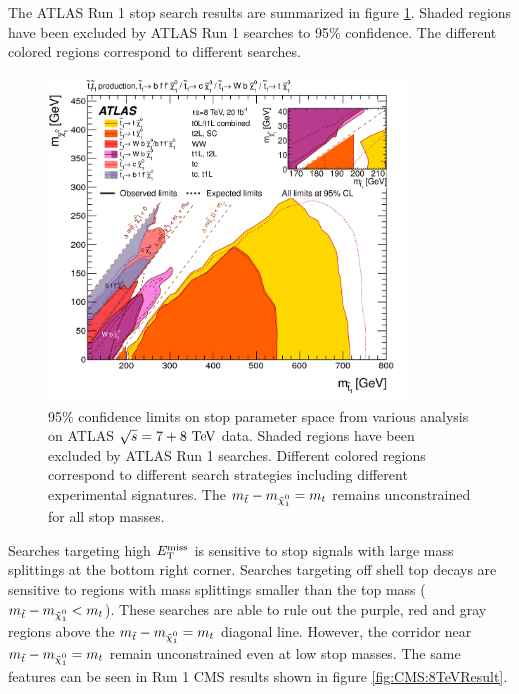 \indent The ATLAS Run 1 stop search results are summarized in figure \ref{fig:ATLAS:8TeVResult}.  Shaded regions have been excluded by ATLAS Run 1 searches to 95\% confidence.  The different colored regions correspond to different searches.  \\

\begin{figure}[h!]
\centering
    \includegraphics[width=0.85\textwidth]{figures/8TeV/ATLAS_SUSY_Stop_tLSP_201507.png}\hspace{0.05\textwidth}
\caption[95\% confidence limits on stop parameter space from various analysis on ATLAS $\sqrt{s} = 7+8 \tev$ data]{ 95\% confidence limits on stop parameter space from various analysis on ATLAS $\sqrt{s} = 7+8 \tev$ data.  Shaded regions have been excluded by ATLAS Run 1 searches.  Different colored regions correspond to different search strategies including different experimental signatures. The $m_{\stop}-m_{\ninoone} = m_t$ remains unconstrained for all stop masses. }
\label{fig:ATLAS:8TeVResult}
\end{figure}

\indent Searches targeting high $E_{\mathrm{T}}^{\mathrm{miss}}$ is sensitive to stop signals with large mass splittings at the bottom right corner. Searches targeting off shell top decays are sensitive to regions with mass splittings smaller than the top mass ($m_{\stop}-m_{\ninoone} < m_t$).  These searches are able to rule out the purple, red and gray regions above the $m_{\stop}-m_{\ninoone} = m_t$ diagonal line.  However, the corridor near $m_{\stop}-m_{\ninoone} = m_t$ remain unconstrained even at low stop masses.  The same features can be seen in Run 1 CMS results shown in figure \ref{fig:CMS:8TeVResult}. \\

